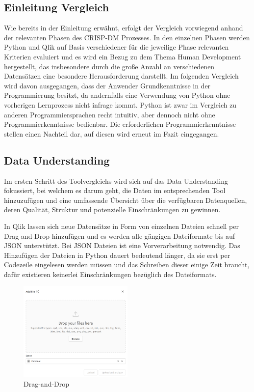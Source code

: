 \documentclass[12pt]{article}
\begin{document}
	\subsection{Einleitung Vergleich}
	Wie bereits in der Einleitung erwähnt, erfolgt der Vergleich vorwiegend anhand der relevanten Phasen des CRISP-DM Prozesses. In den einzelnen Phasen werden Python und Qlik auf Basis verschiedener für die jeweilige Phase relevanten Kriterien evaluiert und es wird ein Bezug zu dem Thema Human Development hergestellt, das insbesondere durch die große Anzahl an verschiedenen Datensätzen eine besondere Herausforderung darstellt. Im folgenden Vergleich wird davon ausgegangen, dass der Anwender Grundkenntnisse in der Programmierung besitzt, da andernfalls eine Verwendung von Python ohne vorherigen Lernprozess nicht infrage kommt. Python ist zwar im Vergleich zu anderen Programmiersprachen recht intuitiv, aber dennoch nicht ohne Programmierkenntnisse bedienbar. Die erforderlichen Programmierkenntnisse stellen einen Nachteil dar, auf diesen wird erneut im Fazit eingegangen.
	
	\subsection{Data Understanding}
	Im ersten Schritt des Toolvergleichs wird sich auf das Data Understanding fokussiert, bei welchem es darum geht, die Daten im entsprechenden Tool hinzuzufügen und eine umfassende Übersicht über die verfügbaren Datenquellen, deren Qualität, Struktur und potenzielle Einschränkungen zu gewinnen.

	In Qlik lassen sich neue Datensätze in Form von einzelnen Dateien schnell per Drag-and-Drop hinzufügen und es werden alle gängigen Dateiformate bis auf JSON unterstützt. Bei JSON Dateien ist eine Vorverarbeitung notwendig. Das Hinzufügen der Dateien in Python dauert bedeutend länger, da sie erst per Codezeile eingelesen werden müssen und das Schreiben dieser einige Zeit braucht, dafür existieren keinerlei Einschränkungen bezüglich des Dateiformats.
	\begin{figure}[h]
		\centering
		\includegraphics[width=0.5\textwidth]{dragndrop}
		\caption{Drag-and-Drop}
	\end{figure}
	
\end{document}
